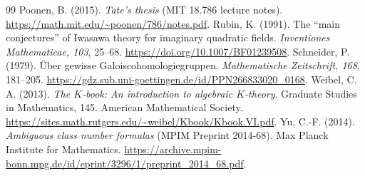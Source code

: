 \documentclass[11pt]{article}
\theoremstyle{remark}\newtheorem{remark}[theorem]{Remark}
\begin{document}
\begin{thebibliography}{99}
Poonen, B. (2015). \emph{Tate's thesis} (MIT 18.786 lecture notes).
\url{https://math.mit.edu/~poonen/786/notes.pdf}.
Rubin, K. (1991). The ``main conjectures'' of Iwasawa theory for imaginary quadratic fields.
\emph{Inventiones Mathematicae, 103}, 25--68.
\url{https://doi.org/10.1007/BF01239508}.
Schneider, P. (1979). \"Uber gewisse Galoiscohomologiegruppen.
\emph{Mathematische Zeitschrift, 168}, 181--205.
\url{https://gdz.sub.uni-goettingen.de/id/PPN266833020_0168}.
Weibel, C. A. (2013). \emph{The $K$-book: An introduction to algebraic $K$-theory}.
Graduate Studies in Mathematics, 145. American Mathematical Society.
\url{https://sites.math.rutgers.edu/~weibel/Kbook/Kbook.VI.pdf}.
Yu, C.-F. (2014). \emph{Ambiguous class number formulas} (MPIM Preprint 2014-68).
Max Planck Institute for Mathematics.
\url{https://archive.mpim-bonn.mpg.de/id/eprint/3296/1/preprint_2014_68.pdf}.

\end{thebibliography}
\end{document}
